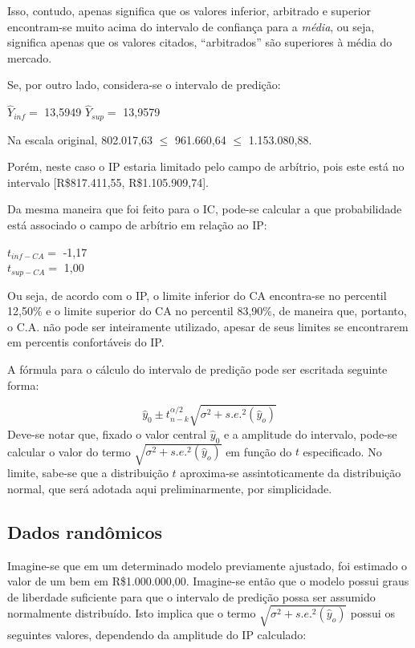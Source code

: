 \documentclass[a4paper, 12pt]{article}
\begin{document}
Isso, contudo, apenas significa que os valores inferior, arbitrado e
superior encontram-se muito acima do intervalo de confiança para a
\emph{média}, ou seja, significa apenas que os valores citados,
``arbitrados'' são superiores à média do mercado.

Se, por outro lado, considera-se o intervalo de predição:

\(\hat Y_{inf} =\) 13,5949 \(\hat Y_{sup} =\) 13,9579

Na escala original, 802.017,63 \(\leq\) 961.660,64 \(\leq\)
1.153.080,88.

Porém, neste caso o IP estaria limitado pelo campo de arbítrio, pois
este está no intervalo {[}R\$817.411,55, R\$1.105.909,74{]}.

Da mesma maneira que foi feito para o IC, pode-se calcular a que
probabilidade está associado o campo de arbítrio em relação ao IP:

\(t_{inf-CA} =\) -1,17\\
\(t_{sup-CA} =\) 1,00

Ou seja, de acordo com o IP, o limite inferior do CA encontra-se no
percentil 12,50\% e o limite superior do CA no percentil 83,90\%, de
maneira que, portanto, o C.A. não pode ser inteiramente utilizado,
apesar de seus limites se encontrarem em percentis confortáveis do IP.

A fórmula para o cálculo do intervalo de predição pode ser escritada
seguinte forma:

\[\hat y_0 \pm t_{n-k}^{\alpha/2}\sqrt{\sigma^2+s.e.^2(\hat y_o)}\]
Deve-se notar que, fixado o valor central \(\hat y_0\) e a amplitude do
intervalo, pode-se calcular o valor do termo
\(\sqrt{\sigma^2+s.e.^2(\hat y_o)}\) em função do \(t\) especificado. No
limite, sabe-se que a distribuição \(t\) aproxima-se assintoticamente da
distribuição normal, que será adotada aqui preliminarmente, por
simplicidade.

\hypertarget{dados-randomicos}{%
\subsection{Dados randômicos}\label{dados-randomicos}}

Imagine-se que em um determinado modelo previamente ajustado, foi
estimado o valor de um bem em R\$1.000.000,00. Imagine-se então que o
modelo possui graus de liberdade suficiente para que o intervalo de
predição possa ser assumido normalmente distribuído. Isto implica que o
termo \(\sqrt{\sigma^2+s.e.^2(\hat y_o)}\) possui os seguintes valores,
dependendo da amplitude do IP calculado:
\end{document}
